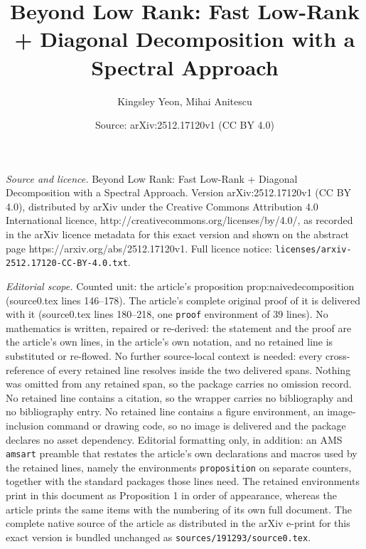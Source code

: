 \documentclass[10pt,a4paper]{amsart}
\title{Beyond Low Rank: Fast Low-Rank + Diagonal Decomposition with a Spectral Approach}
\author{Kingsley Yeon, Mihai Anitescu}
\date{Source: arXiv:2512.17120v1 (CC BY 4.0)}
\begin{document}
\maketitle

\noindent\emph{Source and licence.} Beyond Low Rank: Fast Low-Rank + Diagonal Decomposition with a Spectral Approach. Version arXiv:2512.17120v1 (CC BY 4.0), distributed by arXiv under the Creative Commons Attribution 4.0 International licence, http://creativecommons.org/licenses/by/4.0/, as recorded in the arXiv licence metadata for this exact version and shown on the abstract page https://arxiv.org/abs/2512.17120v1. Full licence notice: \texttt{licenses/arxiv-2512.17120-CC-BY-4.0.txt}.\par\smallskip

\noindent\textit{Editorial scope.} Counted unit: the article's proposition prop:naivedecomposition (source0.tex lines 146--178). The article's complete original proof of it is delivered with it (source0.tex lines 180--218, one \texttt{proof} environment of 39 lines). No mathematics is written, repaired or re-derived: the statement and the proof are the article's own lines, in the article's own notation, and no retained line is substituted or re-flowed.  No further source-local context is needed: every cross-reference of every retained line resolves inside the two delivered spans.  Nothing was omitted from any retained span, so the package carries no omission record.  No retained line contains a citation, so the wrapper carries no bibliography and no bibliography entry.  No retained line contains a figure environment, an image-inclusion command or drawing code, so no image is delivered and the package declares no asset dependency.  Editorial formatting only, in addition: an AMS \texttt{amsart} preamble that restates the article's own declarations and macros used by the retained lines, namely the environments \texttt{proposition} on separate counters, together with the standard packages those lines need.  The retained environments print in this document as Proposition 1 in order of appearance, whereas the article prints the same items with the numbering of its own full document.  The complete native source of the article as distributed in the arXiv e-print for this exact version is bundled unchanged as \texttt{sources/191293/source0.tex}.
\end{document}

